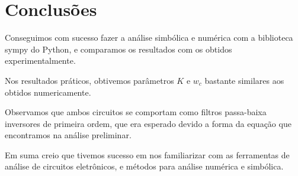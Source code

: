 \section{Conclusões}


Conseguimos com sucesso fazer a análise simbólica e numérica com a biblioteca sympy do Python, e comparamos os resultados com os obtidos experimentalmente.

Nos resultados práticos, obtivemos parâmetros $K$ e $w_c$ bastante similares aos obtidos numericamente.

Observamos que ambos circuitos se comportam como filtros passa-baixa inversores de primeira ordem, que era esperado devido a forma da equação que encontramos na análise preliminar.

Em suma creio que tivemos sucesso em nos familiarizar com as ferramentas de análise de circuitos eletrônicos, e métodos para análise numérica e simbólica.
